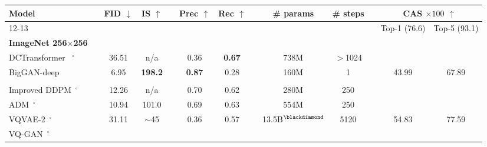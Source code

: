
\begin{table}[ht]
\small
    \centering
    {\small
    \begin{tabular}{lc ccc ccc ccc cc}
    \toprule
     {Model} & 
    
     & {FID}  $\downarrow$ & {IS}  $\uparrow$ & 
     &  {Prec}  $\uparrow$ & {Rec}   $\uparrow$ &
     
     &{\# params} & {\# steps} &
     
     & \multicolumn{2}{c}{{CAS $\times 100$} $\uparrow$}  
     \\
     \cline{12-13}
    &&  && & &&& & && {Top-1 (76.6)} & {Top-5 (93.1)} \\[-7pt]
    \textbf{ImageNet 256$\times$256} && &&& &&& &&& &
    \\[-2pt]
    \midrule
    

     
    DCTransformer~\cite{nash2021generating} $^\square$ &
    & 36.51 & n/a &
    & 0.36 & \textbf{0.67} &
    & 738M & $>$1024 &   & &
     \\ 
    
    BigGAN-deep~\cite{biggan}  & %
    & 6.95 & \bfseries{198.2} &
    & \textbf{0.87} & 0.28 &
    & 160M & 1 & & 43.99 &67.89 \\
    \\
    
    Improved DDPM~\cite{nichol2021improved}$^\square$  &
    & 12.26 & n/a  &
    & 0.70 & 0.62 &
     & 280M & 250  &  &  & \\
    
    ADM~\cite{dhariwal2021diffusion}$^\square$   & 
    & 10.94 & 101.0  &
    & 0.69 & 0.63 &
    & 554M & 250 &  &  & \\
    

    
    VQVAE-2~\cite{Razavi19vqvae2}$^\square$ &
    & 31.11 & $\sim$45 &
    & 0.36 & 0.57 &
    & 13.5B$^{\blackdiamond}$ & 5120 & & 54.83 & 77.59 \\
    \midrule
    VQ-GAN~\cite{Esser21vqgan}$^\square$ &
    

\end{tabular}}
\end{table}
